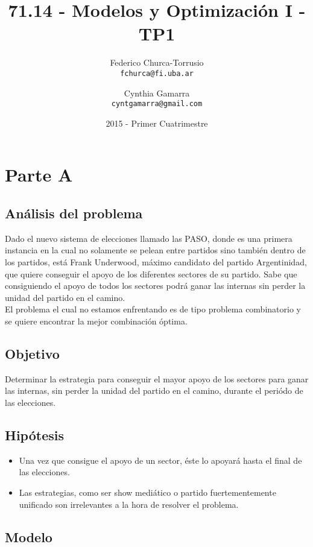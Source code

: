 \documentclass[10pt, a4paper, titlepage,
	oneside,
	fleqn, leqno]{article}
\title{71.14 - Modelos y Optimización I - TP1}
\author{
	Federico Churca-Torrusio \\\texttt{fchurca@fi.uba.ar}
	\and
	Cynthia Gamarra \\\texttt{cyntgamarra@gmail.com}}
\date{2015 - Primer Cuatrimestre}
\let\oldsection\section
\def\section{\cleardoublepage\oldsection}
\begin{document}
\maketitle

\cleardoublepage
{}
\setcounter{page}{1}

\section{Parte A}

\subsection{Análisis del problema}
Dado el nuevo sistema de elecciones llamado las PASO, donde es una primera instancia en la cual no solamente se pelean entre partidos sino también dentro de los partidos, está Frank Underwood, máximo candidato del partido Argentinidad, que quiere conseguir el apoyo de los diferentes sectores de su partido. Sabe que consiguiendo el apoyo de todos los sectores podrá ganar las internas sin perder la unidad del partido en el camino.\\
El problema el cual no estamos enfrentando es de tipo problema combinatorio y se quiere encontrar la mejor combinación óptima.
\subsection{Objetivo}
Determinar la estrategia para conseguir el mayor apoyo de los sectores para ganar las internas, sin perder la unidad del partido en el camino, durante el periódo de las elecciones.

\subsection{Hipótesis}
\begin{itemize}
 \item Una vez que consigue el apoyo de un sector, éste lo apoyará hasta el final de las elecciones.
 \item Las estrategias, como ser show mediático o partido fuertementemente unificado son irrelevantes a la hora de resolver el problema.
\end{itemize}
\subsection{Modelo}
\end{document}
